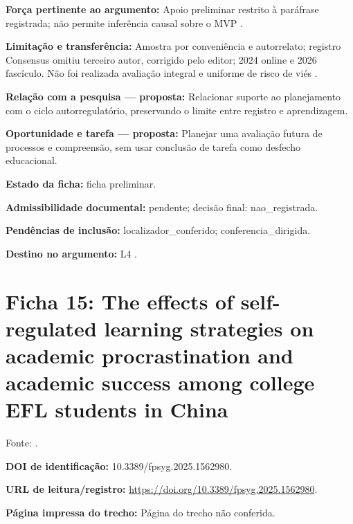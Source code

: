 \noindent\textbf{Força pertinente ao argumento:} Apoio preliminar restrito à paráfrase registrada; não permite inferência causal sobre o MVP \citep{education_taghavi2024}.\par\medskip

\noindent\textbf{Limitação e transferência:} Amostra por conveniência e autorrelato; registro Consensus omitiu terceiro autor, corrigido pelo editor; 2024 online e 2026 fascículo. Não foi realizada avaliação integral e uniforme de risco de viés \citep{education_taghavi2024}.\par\medskip

\noindent\textbf{Relação com a pesquisa — proposta:} Relacionar suporte ao planejamento com o ciclo autorregulatório, preservando o limite entre registro e aprendizagem.\par\medskip

\noindent\textbf{Oportunidade e tarefa — proposta:} Planejar uma avaliação futura de processos e compreensão, sem usar conclusão de tarefa como desfecho educacional.\par\medskip

\noindent\textbf{Estado da ficha:} ficha preliminar.\par\medskip

\noindent\textbf{Admissibilidade documental:} pendente; decisão final: nao\_registrada.\par\medskip

\noindent\textbf{Pendências de inclusão:} localizador\_conferido; conferencia\_dirigida.\par\medskip

\noindent\textbf{Destino no argumento:} L4 .

\clearpage\section*{Ficha 15: The effects of self-regulated learning strategies on academic procrastination and academic success among college EFL students in China}

Fonte: \citet{education_tao2025}.

\noindent\textbf{DOI de identificação:} 10.3389/fpsyg.2025.1562980.\par\medskip

\noindent\textbf{URL de leitura/registro:} \url{https://doi.org/10.3389/fpsyg.2025.1562980}.\par\medskip

\noindent\textbf{Página impressa do trecho:} Página do trecho não conferida.\par\medskip

